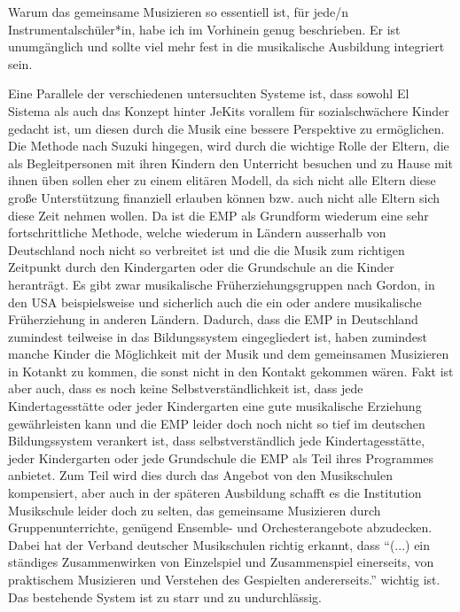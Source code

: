 
Warum das gemeinsame Musizieren so essentiell ist, für jede/n
Instrumentalschüler*in, habe ich im Vorhinein genug beschrieben. Er ist
unumgänglich und sollte viel mehr fest in die musikalische Ausbildung integriert
sein.

Eine Parallele der verschiedenen untersuchten Systeme ist, dass sowohl El
Sistema als auch das Konzept hinter JeKits vorallem für sozialschwächere Kinder
gedacht ist, um diesen durch die Musik eine bessere Perspektive zu ermöglichen.
Die Methode nach Suzuki hingegen, wird durch die wichtige Rolle der Eltern, die
als Begleitpersonen mit ihren Kindern den Unterricht besuchen und zu Hause mit
ihnen üben sollen eher zu einem elitären Modell, da sich nicht alle Eltern diese
große Unterstützung finanziell erlauben können bzw. auch nicht alle Eltern sich
diese Zeit nehmen wollen. Da ist die EMP als Grundform wiederum eine sehr
fortschrittliche Methode, welche wiederum in Ländern ausserhalb von Deutschland
noch nicht so verbreitet ist und die die Musik zum richtigen Zeitpunkt durch den
Kindergarten oder die Grundschule an die Kinder heranträgt. Es gibt zwar
musikalische Früherziehungsgruppen nach Gordon, in den USA beispielsweise und
sicherlich auch die ein oder andere musikalische Früherziehung in anderen
Ländern. Dadurch, dass die EMP in Deutschland zumindest teilweise in das
Bildungssystem eingegliedert ist, haben zumindest manche Kinder die Möglichkeit
mit der Musik und dem gemeinsamen Musizieren in Kotankt zu kommen, die sonst
nicht in den Kontakt gekommen wären. Fakt ist aber auch, dass es noch keine
Selbstverständlichkeit ist, dass jede Kindertagesstätte oder jeder Kindergarten
eine gute musikalische Erziehung gewährleisten kann und die EMP leider doch noch
nicht so tief im deutschen Bildungssystem verankert ist, dass selbstverständlich
jede Kindertagesstätte, jeder Kindergarten oder jede Grundschule die EMP als
Teil ihres Programmes anbietet. Zum Teil wird dies durch das Angebot von den
Musikschulen kompensiert, aber auch in der späteren Ausbildung schafft es die
Institution Musikschule leider doch zu selten, das gemeinsame Musizieren durch
Gruppenunterrichte, genügend Ensemble- und Orchesterangebote abzudecken. Dabei
hat der Verband deutscher Musikschulen richtig erkannt, dass \enquote{(...) ein
ständiges Zusammenwirken von Einzelspiel und Zusammenspiel einerseits, von
praktischem Musizieren und Verstehen des Gespielten andererseits.} wichtig ist.
\autocite[22]{losert:die_kunst_zu_unterrichten} Das bestehende System ist zu
starr und zu undurchlässig.

